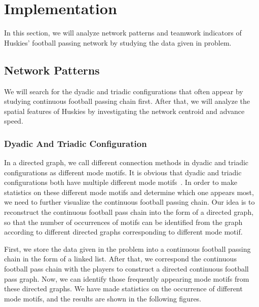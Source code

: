 \documentclass{mcmthesis}
\begin{document}
\section{Implementation}
	In this section, we will analyze network patterns and teamwork indicators of Huskies' football passing network by studying the data given in problem. 
\subsection{Network Patterns}
	We will search for the dyadic and triadic configurations that often appear by studying continuous football passing chain first.  After that, we will analyze the spatial features of Huskies by investigating the network centroid and advance speed.
\subsubsection{Dyadic And Triadic Configuration}
	In a directed graph, we call different connection methods in dyadic and triadic configurations as different mode motifs.  It is obvious that dyadic and triadic configurations both have multiple different mode motifs~\cite{Second}.  In order to make statistics on these different mode motifs and determine which one appears most, we need to further visualize the continuous football passing chain.  Our idea is to reconstruct the continuous football pass chain into the form of a directed graph, so that the number of occurrences of motifs can be identified from the graph according to different directed graphs corresponding to different mode motif.

	First, we store the data given in the problem into a continuous football passing chain in the form of a linked list.  After that, we correspond the continuous football pass chain with the players to construct a directed continuous football pass graph.  Now, we can identify those frequently appearing mode motifs from these directed graphs.  We have made statistics on the occurrence of different mode motifs, and the results are shown in the following figures.
\end{document}
